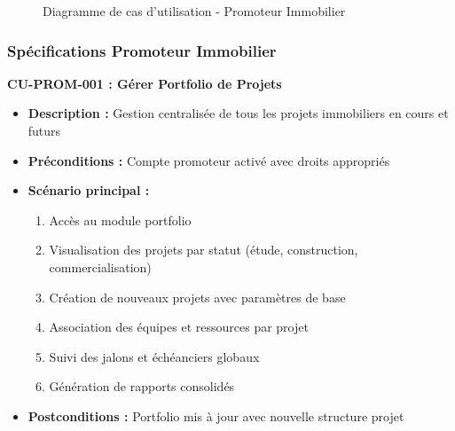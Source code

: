 \begin{figure}[H]
\caption{Diagramme de cas d'utilisation - Promoteur Immobilier}
\label{fig:cas_utilisation_promoteur}
\end{figure}

\subsubsection{Spécifications Promoteur Immobilier}

\textbf{CU-PROM-001 : Gérer Portfolio de Projets}
\begin{itemize}
    \item \textbf{Description :} Gestion centralisée de tous les projets immobiliers en cours et futurs
    \item \textbf{Préconditions :} Compte promoteur activé avec droits appropriés
    \item \textbf{Scénario principal :}
    \begin{enumerate}
        \item Accès au module portfolio
        \item Visualisation des projets par statut (étude, construction, commercialisation)
        \item Création de nouveaux projets avec paramètres de base
        \item Association des équipes et ressources par projet
        \item Suivi des jalons et échéanciers globaux
        \item Génération de rapports consolidés
    \end{enumerate}
    \item \textbf{Postconditions :} Portfolio mis à jour avec nouvelle structure projet
\end{itemize}

